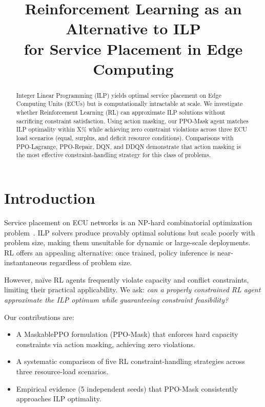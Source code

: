 \documentclass[conference]{IEEEtran}
\begin{document}
\title{Reinforcement Learning as an Alternative to ILP\\
for Service Placement in Edge Computing}

\author{
}

\maketitle

\begin{abstract}
Integer Linear Programming (ILP) yields optimal service placement on Edge
Computing Units (ECUs) but is computationally intractable at scale.
We investigate whether Reinforcement Learning (RL) can approximate ILP
solutions without sacrificing constraint satisfaction.
Using action masking, our PPO-Mask agent matches ILP optimality within
X\% while achieving zero constraint violations across three ECU
load scenarios (equal, surplus, and deficit resource conditions).
Comparisons with PPO-Lagrange, PPO-Repair, DQN, and DDQN demonstrate
that action masking is the most effective constraint-handling strategy
for this class of problems.
\end{abstract}

\section{Introduction}

Service placement on ECU networks is an NP-hard combinatorial
optimization problem~\cite{ref_ilp}.
ILP solvers produce provably optimal solutions but scale poorly with
problem size, making them unsuitable for dynamic or large-scale
deployments.
RL offers an appealing alternative: once trained, policy inference is
near-instantaneous regardless of problem size.

However, naïve RL agents frequently violate capacity and conflict
constraints, limiting their practical applicability.
We ask: \textit{can a properly constrained RL agent approximate the
ILP optimum while guaranteeing constraint feasibility?}

Our contributions are:
\begin{itemize}
  \item A MaskablePPO formulation (PPO-Mask) that enforces hard
        capacity constraints via action masking, achieving zero violations.
  \item A systematic comparison of five RL constraint-handling
        strategies across three resource-load scenarios.
  \item Empirical evidence (5 independent seeds) that PPO-Mask
        consistently approaches ILP optimality.
\end{itemize}
\end{document}
